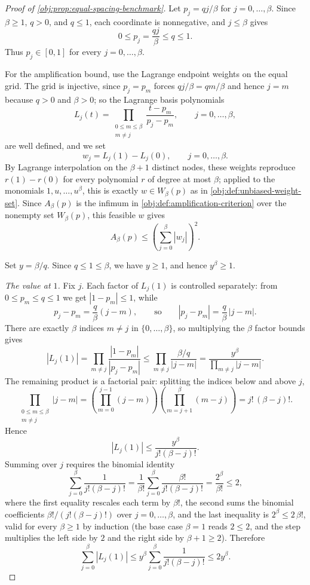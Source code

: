 \begin{proof}[Proof of \cref{obj:prop:equal-spacing-benchmark}]
Let \(p_j=qj/\beta\) for \(j=0,\ldots,\beta\). Since \(\beta\ge1\), \(q>0\), and \(q\le1\), each coordinate is nonnegative, and \(j\le\beta\) gives
\[
0\le p_j=\frac{qj}{\beta}\le q\le1.
\]
Thus \(p_j\in[0,1]\) for every \(j=0,\ldots,\beta\). %

For the amplification bound, use the Lagrange endpoint weights on the equal grid. The grid is injective, since \(p_j=p_m\) forces \(qj/\beta=qm/\beta\) and hence \(j=m\) because \(q>0\) and \(\beta>0\); %
so the Lagrange basis polynomials
\[
L_j(t)=\prod_{\substack{0\le m\le\beta\\ m\ne j}}\frac{t-p_m}{p_j-p_m},
\qquad j=0,\ldots,\beta,
\]
are well defined, and we set
\[
w_j=L_j(1)-L_j(0),
\qquad j=0,\ldots,\beta .
\]
By Lagrange interpolation on the \(\beta+1\) distinct nodes, these weights reproduce \(r(1)-r(0)\) for every polynomial \(r\) of degree at most \(\beta\); applied to the monomials \(1,u,\ldots,u^\beta\), this is exactly \(w\in W_\beta(p)\) as in \cref{obj:def:unbiased-weight-set}. %
Since \(A_\beta(p)\) is the infimum in \cref{obj:def:amplification-criterion} over the nonempty set \(W_\beta(p)\), this feasible \(w\) gives
\[
A_\beta(p)\le \left(\sum_{j=0}^{\beta}|w_j|\right)^2.
\] %

Set \(y=\beta/q\). Since \(q\le1\le\beta\), we have \(y\ge1\), and hence \(y^\beta\ge1\). %

\emph{The value at \(1\).}
Fix \(j\). Each factor of \(L_j(1)\) is controlled separately: from \(0\le p_m\le q\le 1\) we get \(|1-p_m|\le1\), while
\[
p_j-p_m=\frac{q}{\beta}(j-m),
\qquad\text{so}\qquad
|p_j-p_m|=\frac{q}{\beta}\,|j-m| .
\]
There are exactly \(\beta\) indices \(m\ne j\) in \(\{0,\ldots,\beta\}\), so multiplying the \(\beta\) factor bounds gives
\[
|L_j(1)|
=
\prod_{m\ne j}\frac{|1-p_m|}{|p_j-p_m|}
\le
\prod_{m\ne j}\frac{\beta/q}{|j-m|}
=
\frac{y^\beta}{\prod_{m\ne j}|j-m|}.
\]
The remaining product is a factorial pair: splitting the indices below and above \(j\),
\[
\prod_{\substack{0\le m\le\beta\\ m\ne j}}|j-m|
=
\left(\prod_{m=0}^{j-1}(j-m)\right)\left(\prod_{m=j+1}^{\beta}(m-j)\right)
=
j!\,(\beta-j)! .
\]
Hence
\[
|L_j(1)|
\le
\frac{y^\beta}{j!(\beta-j)!}.
\] %
Summing over \(j\) requires the binomial identity
\[
\sum_{j=0}^{\beta}\frac{1}{j!(\beta-j)!}
=
\frac{1}{\beta!}\sum_{j=0}^{\beta}\frac{\beta!}{j!(\beta-j)!}
=
\frac{2^\beta}{\beta!}
\le
2,
\]
where the first equality rescales each term by \(\beta!\), the second sums the binomial coefficients \(\beta!/(j!(\beta-j)!)\) over \(j=0,\ldots,\beta\), and the last inequality is \(2^\beta\le2\,\beta!\), valid for every \(\beta\ge1\) by induction (the base case \(\beta=1\) reads \(2\le2\), and the step multiplies the left side by \(2\) and the right side by \(\beta+1\ge2\)). %
Therefore
\[
\sum_{j=0}^{\beta}|L_j(1)|
\le
y^\beta\sum_{j=0}^{\beta}\frac{1}{j!(\beta-j)!}
\le
2y^\beta .
\]


\end{proof}
